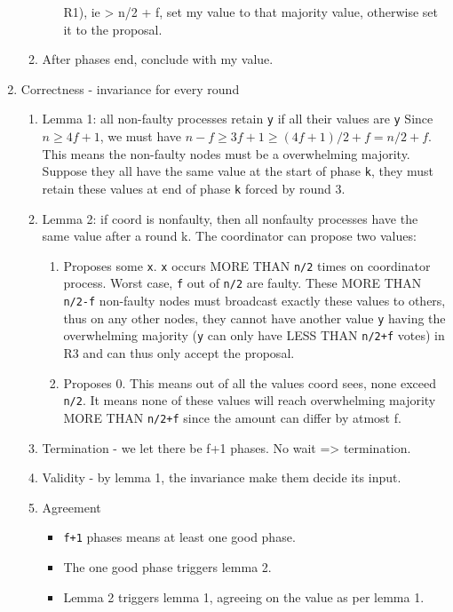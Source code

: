 \documentclass[11pt]{article}
\begin{document}
\begin{enumerate}
\begin{enumerate}
\begin{enumerate}
R1), ie > n/2 + f, set my value to that majority value, otherwise set it
to the proposal.
\end{enumerate}
\item After phases end, conclude with my value.
\end{enumerate}
\item Correctness - invariance for every round
\label{sec:orgc10b869}
\begin{enumerate}
\item Lemma 1: all non-faulty processes retain \texttt{y} if all their values are \texttt{y}
\label{sec:orgedda40d}
Since \(n \ge 4f+1\), we must have \(n-f \ge 3f+1 \ge (4f + 1)/2 + f = n/2 + f\).
This means the non-faulty nodes must be a overwhelming majority. Suppose they
all have the same value at the start of phase \texttt{k}, they must retain these values
at end of phase \texttt{k} forced by round 3.
\item Lemma 2: if coord is nonfaulty, then all nonfaulty processes have the same value after a round k.
\label{sec:orgdfd3852}
The coordinator can propose two values:
\begin{enumerate}
\item Proposes some \texttt{x}. \texttt{x} occurs MORE THAN \texttt{n/2} times on coordinator process.
Worst case, \texttt{f} out of \texttt{n/2} are faulty. These MORE THAN \texttt{n/2-f} non-faulty
nodes must broadcast exactly these values to others, thus on any other nodes,
they cannot have another value \texttt{y} having the overwhelming majority (\texttt{y} can
only have LESS THAN \texttt{n/2+f} votes) in R3 and can thus only accept the
proposal.
\item Proposes 0. This means out of all the values coord sees, none exceed \texttt{n/2}.
It means none of these values will reach overwhelming majority MORE THAN
\texttt{n/2+f} since the amount can differ by atmost f.
\end{enumerate}
\item Termination - we let there be f+1 phases. No wait => termination.
\label{sec:org1db44bf}
\item Validity - by lemma 1, the invariance make them decide its input.
\label{sec:org2c6da97}
\item Agreement
\label{sec:org508bce4}
\begin{itemize}
\item \texttt{f+1} phases means at least one good phase.
\item The one good phase triggers lemma 2.
\item Lemma 2 triggers lemma 1, agreeing on the value as per lemma 1.
\end{itemize}
\end{enumerate}
\end{enumerate}
\end{document}

